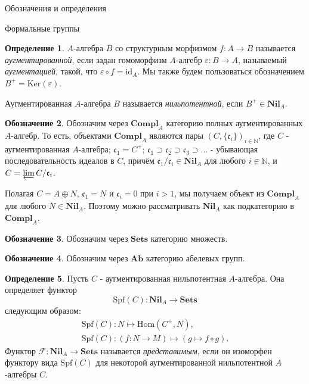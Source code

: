 \documentclass[a4paper,14pt]{extarticle}
\theoremstyle{definition}
\newtheorem{definition}{Определение}[section]
\newtheorem{denotation}[definition]{Обозначение}
\newcommand{\Ab}{\mathbf{Ab}}
\newcommand{\id}{\mathrm{id}}
\newcommand{\Sets}{\mathbf{Sets}}
\newcommand{\Compl}[1]{\mathbf{Compl}_{#1}}
\newcommand{\Ker}[1]{\mathrm{Ker}\left(#1\right)}
\newcommand{\Nil}[1]{\mathbf{Nil}_{#1}}
\newcommand{\Spf}[1]{\mathrm{Spf}\left(#1\right)}
\newcommand{\Hom}[2]{\mathrm{Hom}\left(#1, #2\right)}
\newcommand{\bN}{\mathbb{N}}
\newcommand{\fc}{\mathfrak{c}}
\newcommand{\sF}{\mathscr{F}}
\begin{document}
\begin{section}{Обозначения и определения}
\begin{subsection}{Формальные группы}
\begin{definition}\label{def:3.1:augmented_algebra}
    $A$-алгебра $B$ со структурным морфизмом ${ f : A \rightarrow B }$ называется \textit{аугментированной}, если задан гомоморфизм $A$-алгебр ${ \varepsilon : B \rightarrow A }$, называемый \textit{аугментацией}, такой, что ${ \varepsilon \circ f = \id_A }$. Мы также будем пользоваться обозначением ${ B^+ = \Ker{\varepsilon} }$.

    Аугментированная $A$-алгебра $B$ называется \textit{нильпотентной}, если ${ B^+ \in \Nil{A} }$.
\end{definition}

\begin{denotation}\label{denote:3.after_augmented_algebra:Compl_A}
    Обозначим через $\Compl{A}$ категорию полных аугментированных $A$-алгебр. То есть, объектами $\Compl{A}$ являются пары ${ (C, \{ \fc_i \})_{i \in \bN} }$, где $C$ - аугментированная $A$-алгебра; ${ \fc_1 = C^+ }$; ${ \fc_1 \supset \fc_2 \supset \fc_3 \supset ... }$ - убывающая последовательность идеалов в $C$, причём ${ \fc_1 / \fc_i \in \Nil{A} }$ для любого ${ i \in \bN }$, и ${ C = \varprojlim C / \fc_i }$.

    Полагая ${ C = A \oplus N }$, ${ \fc_1 = N }$ и ${ \fc_i = 0 }$ при ${ i > 1 }$, мы получаем объект из $\Compl{A}$ для любого ${ N \in \Nil{A} }$. Поэтому можно рассматривать $\Nil{A}$ как подкатегорию в $\Compl{A}$.
\end{denotation}

\begin{denotation}\label{denote:3.0:Sets}
    Обозначим через $\Sets$ категорию множеств.
\end{denotation}

\begin{denotation}\label{denote:3.0:Ab}
    Обозначим через $\Ab$ категорию абелевых групп.
\end{denotation}

\begin{definition}\label{def:3.1:representable_functor}
    Пусть $C$ - аугментированная нильпотентная $A$-алгебра. Она определяет функтор
    \begin{equation*}
        \Spf{C} : \Nil{A} \rightarrow \Sets
    \end{equation*}
    следующим образом:
    \begin{gather*}
        \Spf{C} : N \mapsto \Hom{C^+}{N}, \\
        \Spf{C} :
        (f : N \rightarrow M) \mapsto
        (g \mapsto f \circ g).
    \end{gather*}
    Функтор ${ \sF : \Nil{A} \rightarrow \Sets }$ называется \textit{представимым}, если он изоморфен функтору вида $\Spf{C}$ для некоторой аугментированной нильпотентной $A$-алгебры $C$.


\end{definition}
\end{subsection}
\end{section}
\end{document}
